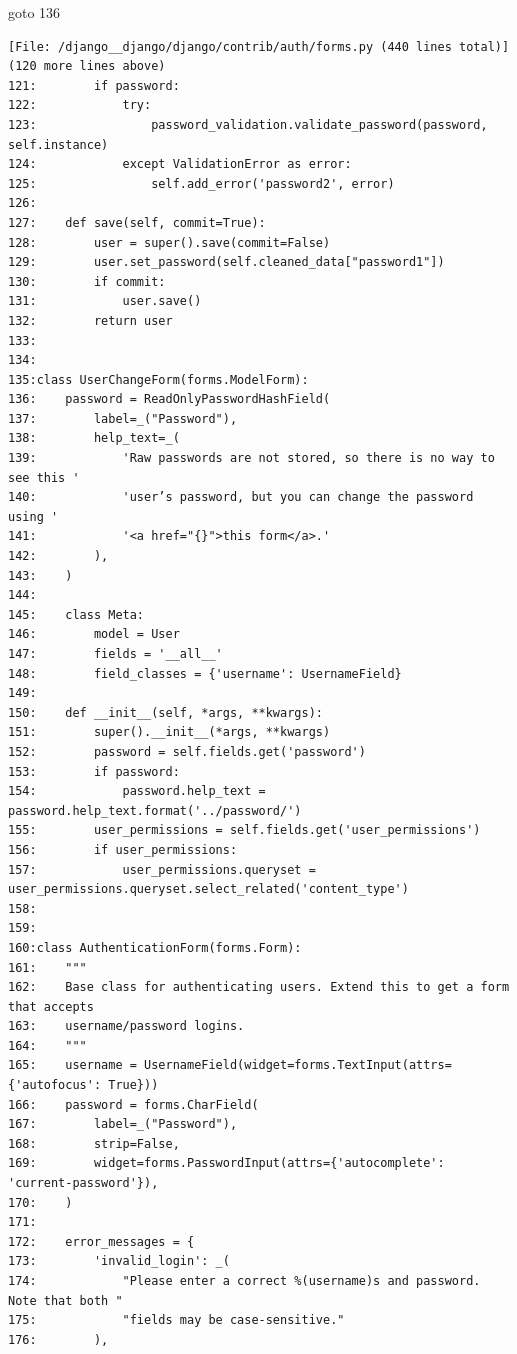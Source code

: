 {\begin{agentbox}
\hrulefill
\begin{CodeVerbatim}[breaklines=true, breakanywhere=true]
goto 136
\end{CodeVerbatim}
\end{agentbox}
\begin{observationbox}\begin{Verbatim}[breaklines=true, breakanywhere=true]
[File: /django__django/django/contrib/auth/forms.py (440 lines total)]
(120 more lines above)
121:        if password:
122:            try:
123:                password_validation.validate_password(password, self.instance)
124:            except ValidationError as error:
125:                self.add_error('password2', error)
126:
127:    def save(self, commit=True):
128:        user = super().save(commit=False)
129:        user.set_password(self.cleaned_data["password1"])
130:        if commit:
131:            user.save()
132:        return user
133:
134:
135:class UserChangeForm(forms.ModelForm):
136:    password = ReadOnlyPasswordHashField(
137:        label=_("Password"),
138:        help_text=_(
139:            'Raw passwords are not stored, so there is no way to see this '
140:            'user’s password, but you can change the password using '
141:            '<a href="{}">this form</a>.'
142:        ),
143:    )
144:
145:    class Meta:
146:        model = User
147:        fields = '__all__'
148:        field_classes = {'username': UsernameField}
149:
150:    def __init__(self, *args, **kwargs):
151:        super().__init__(*args, **kwargs)
152:        password = self.fields.get('password')
153:        if password:
154:            password.help_text = password.help_text.format('../password/')
155:        user_permissions = self.fields.get('user_permissions')
156:        if user_permissions:
157:            user_permissions.queryset = user_permissions.queryset.select_related('content_type')
158:
159:
160:class AuthenticationForm(forms.Form):
161:    """
162:    Base class for authenticating users. Extend this to get a form that accepts
163:    username/password logins.
164:    """
165:    username = UsernameField(widget=forms.TextInput(attrs={'autofocus': True}))
166:    password = forms.CharField(
167:        label=_("Password"),
168:        strip=False,
169:        widget=forms.PasswordInput(attrs={'autocomplete': 'current-password'}),
170:    )
171:
172:    error_messages = {
173:        'invalid_login': _(
174:            "Please enter a correct %(username)s and password. Note that both "
175:            "fields may be case-sensitive."
176:        ),

\end{Verbatim}
\end{observationbox}}

